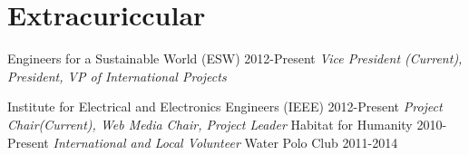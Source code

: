 \documentclass[]{friggeri-cv} %
\begin{document}
\vspace{-8pt}
\section{Extracuriccular}

\begin{entrylist}
\entryFourItem
{Engineers for a Sustainable World (ESW)}
{2012-Present}
{}
{\emph{Vice President (Current), President, VP of International Projects}}

\entryFourItem
{Institute for Electrical and Electronics Engineers  (IEEE)}
{2012-Present}
{}
{\emph{Project Chair(Current), Web Media Chair, Project Leader}}
\entryFourItem
{Habitat for Humanity}
{2010-Present}
{}
{\emph{International and Local Volunteer}}
\entryFourItem
{Water Polo Club}
{2011-2014}
{}
{\emph{}}

\end{entrylist}
\vspace{-8pt}
\vspace{-8pt}
\end{document}
